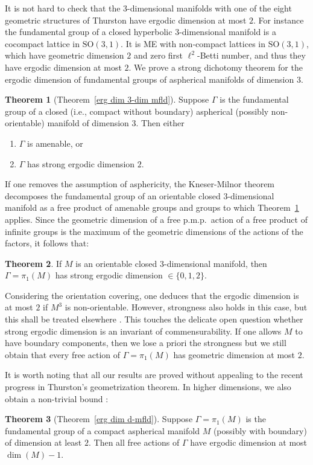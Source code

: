 \documentclass[11pt]{amsart}
\theoremstyle{definition}
\newtheorem{thmintro}{Theorem}
\theoremstyle{plain}
\newcommand{\<}{\langle}
\renewcommand{\>}{\rangle}
\newcommand{\pmp}{\text{p.m.p.}}
\begin{document}
It is not hard to check that the $3$-dimensional manifolds with one of the eight geometric structures of Thurston have ergodic dimension at most $2$.
For instance the fundamental group of a closed hyperbolic $3$-dimensional manifold is a cocompact lattice in $\mathrm{SO}(3,1)$. It is ME with non-compact lattices in $\mathrm{SO}(3,1)$, which have geometric dimension $2$ and zero first $\ell^2$-Betti number, and thus they have ergodic dimension at most $2$.
We prove a strong dichotomy theorem for the ergodic dimension of fundamental
groups of aspherical manifolds of dimension $3$.
\begin{thmintro}[Theorem~\ref{erg dim 3-dim mfld}]
\label{th intro: closed 3-dim dichotomy}
 Suppose $\Gamma$ is the fundamental group of a closed (i.e., compact without boundary) aspherical (possibly non-orientable) manifold of
  dimension $3$. Then either
  \begin{enumerate}
  \item $\Gamma$ is amenable, or
  \item $\Gamma$ has strong ergodic dimension $2$.
  \end{enumerate}
\end{thmintro}

If one removes the assumption of asphericity, the Kneser-Milnor theorem  \cite{Kneser-1929,Milnor-1962} decomposes the fundamental group of an orientable closed $3$-dimensional
manifold as a free product of amenable groups and groups to which Theorem~\ref{th intro: closed 3-dim dichotomy} applies. Since the geometric dimension of a free p.m.p.\ action of a free product of infinite groups is the maximum of the geometric dimensions of the actions of the factors, 
it follows that:
\begin{thmintro}
  If $M$ is an orientable closed $3$-dimensional manifold, then $\Gamma=\pi_1(M)$ has strong ergodic dimension $\in\{0,1,2\}$.
\end{thmintro}
%
Considering the orientation covering, one deduces that the ergodic dimension is at most $2$ if $M^3$ is non-orientable.
However, strongness also holds in this case, but this shall be treated elsewhere \cite{Gab-erg-dim}. This touches the delicate open question whether strong ergodic dimension is an invariant of commensurability.
If one allows $M$ to have boundary components, then we lose a priori the strongness but we still obtain that every \pmp{} free action of $\Gamma=\pi_1(M)$ has geometric dimension at most $2$.

It is worth noting that all our results are proved without appealing to the recent progress in Thurston's geometrization theorem.
%
In higher dimensions, we also obtain a non-trivial bound :
\begin{thmintro}[Theorem~\ref{erg dim d-mfld}]
  Suppose $\Gamma = \pi_1(M)$ is the fundamental group of a compact aspherical manifold
  $M$ (possibly with boundary) of
  dimension at least $2$. Then all free \pmp{} actions of $\Gamma$ have
  ergodic dimension at most $\dim(M) - 1$.
\end{thmintro}
\end{document}

